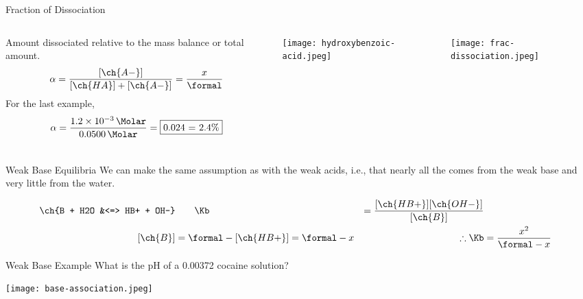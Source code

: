 \documentclass[handout]{beamer}
\begin{document}
\clearpage

\begin{frame}{Fraction of Dissociation}
	\begin{columns}
		Amount dissociated relative to the mass balance or total amount.
		\begin{align*}
			\alpha = \frac{[\ch{A-}]}{[\ch{HA}] + [\ch{A-}]} =
			\frac{x}{\si{\formal}}
		\end{align*}
		For the last example,
		\begin{align*}
			\alpha =
			\frac{\SI{1.2e-3}{\Molar}}{\SI{0.0500}{\Molar}} =
			\fbox{0.024 = 2.4\%}
		\end{align*}
		\begin{center}
			\texttt{[image: hydroxybenzoic-acid.jpeg]}
		\end{center}
		\begin{center}
			\texttt{[image: frac-dissociation.jpeg]}
		\end{center}
	\end{columns}
\end{frame}

\begin{frame}{Weak Base Equilibria}
	We can make the same assumption as with the weak acids, i.e., that
	nearly all the  comes from the weak base and very little from
	the water.

	\begin{align*}
		\ch{B + H2O &<=> HB+ + OH-} &\qquad \Kb &=
		\frac{[\ch{HB+}][\ch{OH-}]}{[\ch{B}]} \\
		[\ch{B}] &= \si{\formal} - [\ch{HB+}] = \si{\formal} - x &\qquad
		\therefore \Kb &= \frac{x^2}{\si{\formal}-x}
	\end{align*}
\end{frame}

\begin{frame}[t]{Weak Base Example}
	What is the pH of a \SI{0.00372}{\Molar} cocaine solution?

	\begin{center}
		\texttt{[image: base-association.jpeg]}
	\end{center}


\end{frame}
\end{document}
